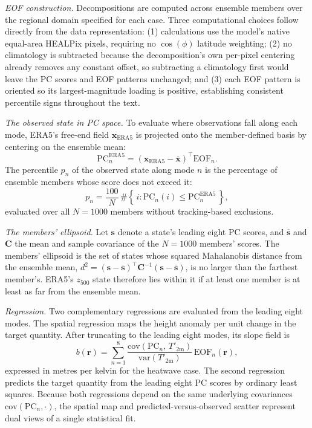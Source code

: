 \noindent\textit{EOF construction.} Decompositions are computed across ensemble members over the regional domain specified for each case. Three computational choices follow directly from the data representation: (1) calculations use the model's native equal-area HEALPix pixels, requiring no $\cos(\phi)$ latitude weighting; (2) no climatology is subtracted because the decomposition's own per-pixel centering already removes any constant offset, so subtracting a climatology first would leave the PC scores and EOF patterns unchanged; and (3) each EOF pattern is oriented so its largest-magnitude loading is positive, establishing consistent percentile signs throughout the text.

\noindent\textit{The observed state in PC space.} To evaluate where observations fall along each mode, ERA5's free-end field $\mathbf{x}_{\mathrm{ERA5}}$ is projected onto the member-defined basis by centering on the ensemble mean:
\begin{equation}
\mathrm{PC}_{n}^{\mathrm{ERA5}} = \left( \mathbf{x}_{\mathrm{ERA5}} - \overline{\mathbf{x}} \right)^{\top} \mathrm{EOF}_{n} .
\end{equation}
The percentile $p_{n}$ of the observed state along mode $n$ is the percentage of ensemble members whose score does not exceed it:
\begin{equation}
p_{n} = \frac{100}{N} \, \# \left\{ \, i : \mathrm{PC}_{n}(i) \le \mathrm{PC}_{n}^{\mathrm{ERA5}} \, \right\} ,
\end{equation}
evaluated over all $N = 1000$ members without tracking-based exclusions.

\noindent\textit{The members' ellipsoid.} Let $\mathbf{s}$ denote a state's leading eight PC scores, and $\overline{\mathbf{s}}$ and $\mathbf{C}$ the mean and sample covariance of the $N = 1000$ members' scores. The members' ellipsoid is the set of states whose squared Mahalanobis distance from the ensemble mean, $d^{2} = (\mathbf{s} - \overline{\mathbf{s}})^{\top} \mathbf{C}^{-1} (\mathbf{s} - \overline{\mathbf{s}})$, is no larger than the farthest member's. ERA5's $z_{500}$ state therefore lies within it if at least one member is at least as far from the ensemble mean.

\noindent\textit{Regression.} Two complementary regressions are evaluated from the leading eight modes. The spatial regression maps the height anomaly per unit change in the target quantity. After truncating to the leading eight modes, its slope field is
\begin{equation}
b(\mathbf{r}) = \sum_{n=1}^{8} \frac{\mathrm{cov}\left( \mathrm{PC}_{n}, \, T'_{\mathrm{2m}} \right)}{\mathrm{var}\left( T'_{\mathrm{2m}} \right)} \, \mathrm{EOF}_{n}(\mathbf{r}) ,
\end{equation}
expressed in metres per kelvin for the heatwave case. The second regression predicts the target quantity from the leading eight PC scores by ordinary least squares. Because both regressions depend on the same underlying covariances $\mathrm{cov}(\mathrm{PC}_{n}, \cdot)$, the spatial map and predicted-versus-observed scatter represent dual views of a single statistical fit.

